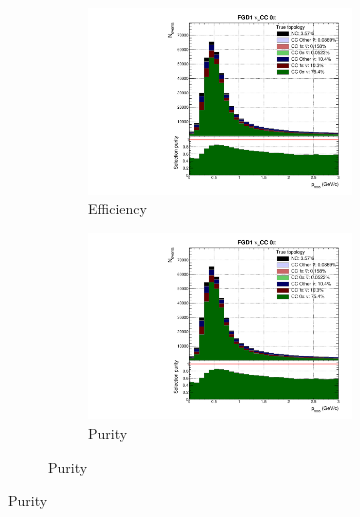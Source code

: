 \begin{figure}[h]
	\centering
	\caption*{2018 analysis}
	\begin{subfigure}[t]{\textwidth}
		\centering
		\begin{subfigure}[t]{0.4\textwidth}
			\includegraphics[width=\textwidth,page=1, trim={0mm 0mm 0mm 9mm}, clip]{figures/mach3/2018/Selection/2018_RedNDmatrix_rebin_verbose_may_noweights_diagnostics}
			\caption{Efficiency}
		\end{subfigure}
		\begin{subfigure}[t]{0.4\textwidth}
			\includegraphics[width=\textwidth,page=2, trim={0mm 0mm 0mm 9mm}, clip]{figures/mach3/2018/Selection/2018_RedNDmatrix_rebin_verbose_may_noweights_diagnostics}
			\caption{Purity}
		\end{subfigure}
	\end{subfigure}
	

\end{figure}

